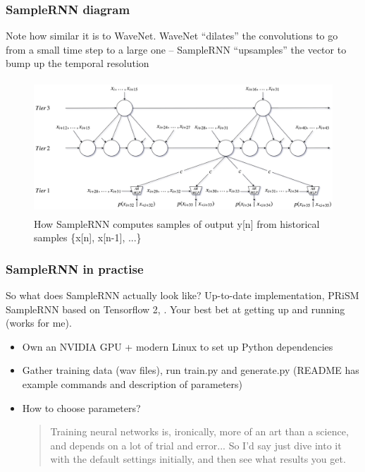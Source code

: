 \documentclass{beamer}
\begin{document}
\begin{frame}
	\frametitle{SampleRNN diagram}
	Note how similar it is to WaveNet. WaveNet ``dilates'' the convolutions to go from a small time step to a large one  -- SampleRNN ``upsamples'' the vector to bump up the temporal resolution
	\begin{figure}
	\includegraphics[height=5cm]{./8_samplernn.png}
		\caption{How SampleRNN computes samples of output y[n] from historical samples \{x[n], x[n-1], ...\}}
	\end{figure}
\end{frame}


\begin{frame}
	\frametitle{SampleRNN in practise}
	So what does SampleRNN actually look like? Up-to-date implementation, PRiSM SampleRNN based on Tensorflow 2, . Your best bet at getting up and running (works for me).
	\begin{itemize}
		\item
			Own an NVIDIA GPU + modern Linux to set up Python dependencies
		\item
			Gather training data (wav files), run train.py and generate.py (README has example commands and description of parameters)
		\item
			How to choose parameters?
			\begin{quote}
				Training neural networks is, ironically, more of an art than a science, and depends on a lot of trial and error... So I'd say just dive into it with the default settings initially, and then see what results you get.
			\end{quote}
	\end{itemize}
\end{frame}
\end{document}

